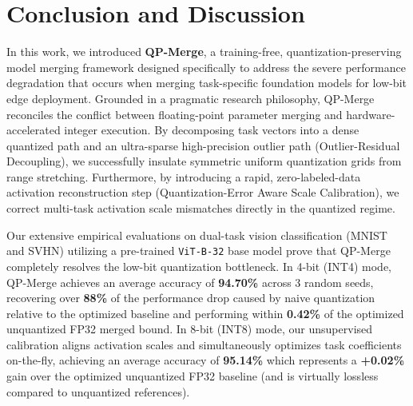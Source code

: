 \section{Conclusion and Discussion}
\label{sec:conclusion}

In this work, we introduced \textbf{QP-Merge}, a training-free, quantization-preserving model merging framework designed specifically to address the severe performance degradation that occurs when merging task-specific foundation models for low-bit edge deployment. Grounded in a pragmatic research philosophy, QP-Merge reconciles the conflict between floating-point parameter merging and hardware-accelerated integer execution. By decomposing task vectors into a dense quantized path and an ultra-sparse high-precision outlier path (Outlier-Residual Decoupling), we successfully insulate symmetric uniform quantization grids from range stretching. Furthermore, by introducing a rapid, zero-labeled-data activation reconstruction step (Quantization-Error Aware Scale Calibration), we correct multi-task activation scale mismatches directly in the quantized regime.

Our extensive empirical evaluations on dual-task vision classification (MNIST and SVHN) utilizing a pre-trained \texttt{ViT-B-32} base model prove that QP-Merge completely resolves the low-bit quantization bottleneck. In 4-bit (INT4) mode, QP-Merge achieves an average accuracy of \textbf{94.70\%} across 3 random seeds, recovering over \textbf{88\%} of the performance drop caused by naive quantization relative to the optimized baseline and performing within \textbf{0.42\%} of the optimized unquantized FP32 merged bound. In 8-bit (INT8) mode, our unsupervised calibration aligns activation scales and simultaneously optimizes task coefficients on-the-fly, achieving an average accuracy of \textbf{95.14\%} which represents a \textbf{+0.02\%} gain over the optimized unquantized FP32 baseline (and is virtually lossless compared to unquantized references).

